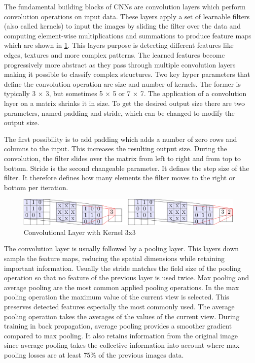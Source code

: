 \documentclass[
a4paper, 
12pt,
grayscalebody, %
abstract=on,
twoside, BCOR10mm, 12pt, DIV13,headinclude, footexclude, final, abstracton, openright
]{ibireprt}
\numberwithin{equation}{chapter}
\numberwithin{table}{chapter}
\numberwithin{figure}{chapter}
\numberwithin{algorithm}{chapter}
\numberwithin{example}{chapter}
\numberwithin{example}{chapter}
\begin{document}
The fundamental building blocks of CNNs are convolution layers which perform convolution operations on input data. These layers apply a set of learnable filters (also called kernels) to input the images by sliding the filter over the data and computing element-wise multiplications and summations to produce feature maps which are shown in \ref{fig:fig2}. This layers purpose is detecting different features like edges, textures and more complex patterns. The learned features become progressively more abstract as they pass through multiple convolution layers making it possible to classify complex structures. Two key hyper parameters that define the convolution operation are size and number of kernels. The former is typically 3 × 3, but sometimes 5 × 5 or 7 × 7. The application of a convolution layer on a matrix shrinks it in size. To get the desired output size there are two parameters, named padding and stride, which can be changed to modify the output size. 
 
 The first possibility is to add padding which adds a number of zero rows and columns to the input. This increases the resulting output size. During the convolution, the filter slides over the matrix from left to right and from top to bottom. Stride is the second changeable parameter. It defines the step size of the filter. It therefore defines how many elements the filter moves to the right or bottom per iteration.
  
  
\begin{figure}[h]
	\center
	\includegraphics[width = 1 \textwidth]{3x3_conv_layer.png}%
	\caption{Convolutional Layer with Kernel 3x3 \cite{Walle2023}}
	\label{fig:fig2}
\end{figure}


The convolution layer is usually followed by a pooling layer. This layers down sample the feature maps, reducing the spatial dimensions while retaining important information. Usually the stride matches the field size of the pooling operation so that no feature of the previous layer is used twice. Max pooling and average pooling are the most common applied pooling operations. In the max pooling operation the maximum value of the current view is selected. This preserves detected features especially the most commonly used. The average pooling operation takes the averages of the values of the current view. During training in back propagation, average pooling provides a smoother gradient compared to max pooling. It also retains information from the original image since average pooling takes the collective information into account where max-pooling losses are at least 75\% of the previous images data. 
\end{document}
